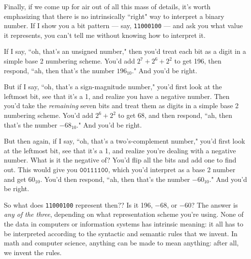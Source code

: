 Finally, if we come up for air out of all this mass of details, it's worth
emphasizing that there is no intrinsically ``right" way to interpret a
binary number. If I show you a bit pattern --- say, \texttt{11000100} ---
and ask you what value it represents, you can't tell me without knowing how
to interpret it.

If I say, ``oh, that's an unsigned number," then you'd treat each bit as a
digit in a simple base 2 numbering scheme. You'd add $2^7 + 2^6 + 2^2$ to
get 196, then respond, ``ah, then that's the number $196_{10}$." And you'd
be right.

But if I say, ``oh, that's a sign-magnitude number," you'd first look at
the leftmost bit, see that it's a 1, and realize you have a negative
number. Then you'd take the \textit{remaining} seven bits and treat them
as digits in a simple base 2 numbering scheme. You'd add $2^6 + 2^2$ to get
68, and then respond, ``ah, then that's the number $-68_{10}$." And you'd
be right.

But then again, if I say, ``oh, that's a two's-complement number," you'd
first look at the leftmost bit, see that it's a 1, and realize you're
dealing with a negative number. What is it the negative of? You'd flip all
the bits and add one to find out. This would give you $\texttt{00111100}$,
which you'd interpret as a base 2 number and get $60_{10}$. You'd then
respond, ``ah, then that's the number $-60_{10}$." And you'd be right.

So what does \texttt{11000100} represent then?? Is it 196, $-68$, or $-60$?
The answer is \textit{any of the three}, depending on what representation
scheme you're using. None of the data in computers or information systems
has intrinsic meaning: it all has to be interpreted according to the
syntactic and semantic rules that we invent. In math and computer science,
anything can be made to mean anything: after all, we invent the rules.
